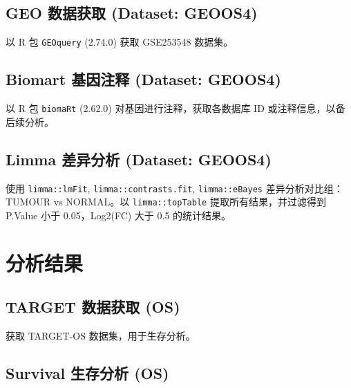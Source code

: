 \documentclass[
]{article}
\begin{document}
\hypertarget{geo-ux6570ux636eux83b7ux53d6-dataset-geoos4}{%
\subsection{GEO 数据获取 (Dataset: GEOOS4)}\label{geo-ux6570ux636eux83b7ux53d6-dataset-geoos4}}

以 R 包 \texttt{GEOquery} (2.74.0) 获取 GSE253548 数据集。

\hypertarget{biomart-ux57faux56e0ux6ce8ux91ca-dataset-geoos4}{%
\subsection{Biomart 基因注释 (Dataset: GEOOS4)}\label{biomart-ux57faux56e0ux6ce8ux91ca-dataset-geoos4}}

以 R 包 \texttt{biomaRt} (2.62.0) 对基因进行注释，获取各数据库 ID 或注释信息，以备后续分析。

\hypertarget{limma-ux5deeux5f02ux5206ux6790-dataset-geoos4}{%
\subsection{Limma 差异分析 (Dataset: GEOOS4)}\label{limma-ux5deeux5f02ux5206ux6790-dataset-geoos4}}

使用 \texttt{limma::lmFit}, \texttt{limma::contrasts.fit}, \texttt{limma::eBayes} 差异分析对比组：TUMOUR vs NORMAL。以 \texttt{limma::topTable} 提取所有结果，并过滤得到 P.Value 小于 0.05，\textbar Log2(FC)\textbar{} 大于 0.5 的统计结果。

\hypertarget{workflow}{%
\section{分析结果}\label{workflow}}

\hypertarget{target-ux6570ux636eux83b7ux53d6-os}{%
\subsection{TARGET 数据获取 (OS)}\label{target-ux6570ux636eux83b7ux53d6-os}}

获取 TARGET-OS 数据集，用于生存分析。

\hypertarget{survival-ux751fux5b58ux5206ux6790-os}{%
\subsection{Survival 生存分析 (OS)}\label{survival-ux751fux5b58ux5206ux6790-os}}
\end{document}
